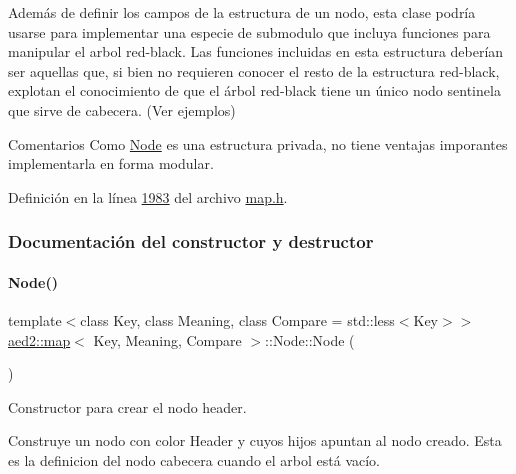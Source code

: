 Además de definir los campos de la estructura de un nodo, esta clase podría usarse para implementar una especie de submodulo que incluya funciones para manipular el arbol red-\/black. Las funciones incluidas en esta estructura deberían ser aquellas que, si bien no requieren conocer el resto de la estructura red-\/black, explotan el conocimiento de que el árbol red-\/black tiene un único nodo sentinela que sirve de cabecera. (Ver ejemplos)

\begin{DoxyRemark}{Comentarios}
Como \hyperlink{structaed2_1_1map_1_1Node}{Node} es una estructura privada, no tiene ventajas imporantes implementarla en forma modular. 
\end{DoxyRemark}


Definición en la línea \hyperlink{map_8h_source_l01983}{1983} del archivo \hyperlink{map_8h_source}{map.\+h}.



\subsubsection{Documentación del constructor y destructor}
\mbox{\label{structaed2_1_1map_1_1Node_a9c1a600491066ce7eb669b1cb76d56c6_a9c1a600491066ce7eb669b1cb76d56c6}} 
\paragraph{\texorpdfstring{Node()}{Node()}\hspace{0.1cm}{\footnotesize\ttfamily [1/2]}}
{\footnotesize\ttfamily template$<$class Key, class Meaning, class Compare = std\+::less$<$\+Key$>$$>$ \\
\hyperlink{classaed2_1_1map}{aed2\+::map}$<$ Key, Meaning, Compare $>$\+::Node\+::\+Node (\begin{DoxyParamCaption}{ }\end{DoxyParamCaption})\hspace{0.3cm}{\ttfamily [inline]}}



Constructor para crear el nodo header. 

Construye un nodo con color Header y cuyos hijos apuntan al nodo creado. Esta es la definicion del nodo cabecera cuando el arbol está vacío.


